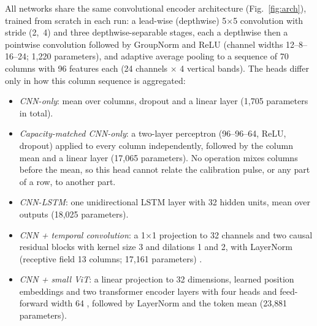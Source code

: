 \documentclass[journal]{IEEEtran}
\begin{document}
All networks share the same convolutional encoder architecture (Fig.~\ref{fig:arch}), trained from scratch in each run: a lead-wise (depthwise) 5$\times$5 convolution with stride (2,~4) and three depthwise-separable stages, each a depthwise then a pointwise convolution followed by GroupNorm and ReLU (channel widths 12--8--16--24; 1{,}220 parameters), and adaptive average pooling to a sequence of 70 columns with 96 features each (24 channels $\times$ 4 vertical bands). The heads differ only in how this column sequence is aggregated:
\begin{itemize}
\item \emph{CNN-only}: mean over columns, dropout and a linear layer (1{,}705 parameters in total).
\item \emph{Capacity-matched CNN-only}: a two-layer perceptron (96--96--64, ReLU, dropout) applied to every column independently, followed by the column mean and a linear layer (17{,}065 parameters). No operation mixes columns before the mean, so this head cannot relate the calibration pulse, or any part of a row, to another part.
\item \emph{CNN-LSTM}: one unidirectional LSTM layer \cite{hochreiter1997lstm} with 32 hidden units, mean over outputs (18{,}025 parameters).
\item \emph{CNN + temporal convolution}: a 1$\times$1 projection to 32 channels and two causal residual blocks with kernel size 3 and dilations 1 and 2, with LayerNorm (receptive field 13 columns; 17{,}161 parameters) \cite{bai2018tcn}.
\item \emph{CNN + small ViT}: a linear projection to 32 dimensions, learned position embeddings and two transformer encoder layers with four heads and feed-forward width 64 \cite{vaswani2017attention,dosovitskiy2021vit}, followed by LayerNorm and the token mean (23{,}881 parameters).
\end{itemize}
\end{document}
